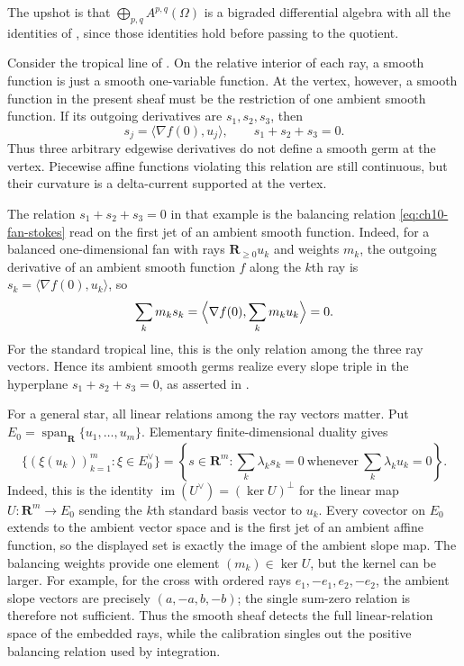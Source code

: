 The upshot is that $\bigoplus_{p,q}A^{p,q}(\Omega)$ is a bigraded
differential algebra with all the identities of
, since those identities hold
before passing to the quotient.

\begin{example}
\label{ex:ch10-smooth-at-vertex}
Consider the tropical line of .  On the
relative interior of each ray, a smooth function is just a smooth
one-variable function.  At the vertex, however, a smooth function in the
present sheaf must be the restriction of one ambient smooth function.
If its outgoing derivatives are $s_1,s_2,s_3$, then
\[
 s_j=\langle \nabla f(0),u_j\rangle,
 \qquad
                         s_1+s_2+s_3=0.
\]
Thus three arbitrary edgewise derivatives do not define a smooth germ at the
vertex.  Piecewise affine functions violating this relation are still
continuous, but their curvature is a delta-current supported at the vertex.
\end{example}

The relation $s_1+s_2+s_3=0$ in that example is the balancing relation
\eqref{eq:ch10-fan-stokes} read on the first jet of an ambient smooth
function.  Indeed, for a balanced one-dimensional fan with rays
$\mathbf R_{\geq0}u_k$ and weights $m_k$, the outgoing derivative of an
ambient smooth function $f$ along the $k$th ray is
$s_k=\langle\nabla f(0),u_k\rangle$, so
\[
 \sum_km_ks_k
 =\Bigl\langle\nabla f(0),\sum_km_ku_k\Bigr\rangle=0 .
\]
For the standard tropical line, this is the only relation among the three
ray vectors.  Hence its ambient smooth germs realize every slope triple in
the hyperplane $s_1+s_2+s_3=0$, as asserted in
.

For a general star, all linear relations among the ray vectors matter.  Put
$E_0=\operatorname{span}_{\mathbf R}\{u_1,\ldots,u_m\}$.  Elementary
finite-dimensional duality gives
\[
 \bigl\{(\xi(u_k))_{k=1}^m:\xi\in E_0^\vee\bigr\}
 =
 \left\{s\in\mathbf R^m:
   \sum_k\lambda_ks_k=0\ \text{whenever}\
   \sum_k\lambda_ku_k=0\right\}.
\]
Indeed, this is the identity
$\operatorname{im}(U^\vee)=(\ker U)^\perp$ for the linear map
$U:\mathbf R^m\to E_0$ sending the $k$th standard basis vector to $u_k$.
Every covector on $E_0$ extends to the ambient vector space and is the first
jet of an ambient affine function, so the displayed set is exactly the image
of the ambient slope map.
The balancing weights provide one element $(m_k)\in\ker U$, but the kernel
can be larger.  For example, for the cross with ordered rays
$e_1,-e_1,e_2,-e_2$, the ambient slope vectors are precisely
$(a,-a,b,-b)$; the single sum-zero relation is therefore not sufficient.
Thus the smooth sheaf detects the full linear-relation space of the embedded
rays, while the calibration singles out the positive balancing relation used
by integration.

